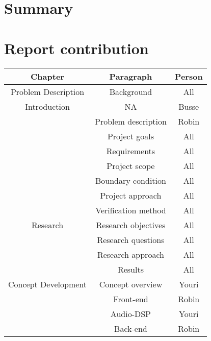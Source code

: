 \begin{justify}

\chapter*{Summary}


\newpage
\tableofcontents
\thispagestyle{empty}

\listoffigures
\thispagestyle{empty}

\listoftables
\thispagestyle{empty}

\newpage
\pagestyle{plain}

\chapter*{Report contribution}	%
\begin{longtable}{|c|c|c|}
	\hline
	\textbf{Chapter} & \textbf{Paragraph} & \textbf{Person} \\ \hline
	Problem Description			& Background					& All	 			\\ \hline
	Introduction				& NA							& Busse 			\\ \hline
								& Problem description			& Robin				\\ \hline
								& Project goals					& All				\\ \hline
								& Requirements					& All 				\\ \hline
								& Project scope					& All 				\\ \hline
								& Boundary condition			& All				\\ \hline
								& Project approach				& All				\\ \hline
								& Verification method			& All				\\ \hline
	Research 					& Research objectives			& All 				\\ \hline
								& Research questions			& All 				\\ \hline
								& Research approach				& All 				\\ \hline
								& Results						& All 				\\ \hline
	Concept Development 		& Concept overview				& Youri				\\ \hline
								& Front-end						& Robin				\\ \hline
								& Audio-DSP						& Youri				\\ \hline
								& Back-end						& Robin				\\ \hline

\end{longtable}
\end{justify}
